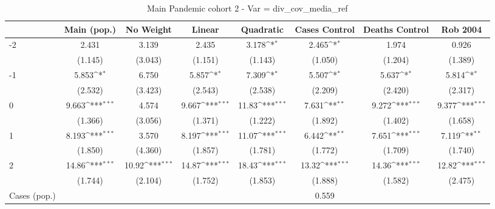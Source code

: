 \documentclass{article}
\begin{document}
{
\def\sym#1{\ifmmode^{#1}\else\(^{#1}\)\fi}
\begin{longtable}{l*{7}{c}}
\caption{Main Pandemic cohort 2 - Var = div\_cov\_media\_ref}\\
\hline\hline\endfirsthead\hline\endhead\hline\endfoot\endlastfoot
                &\multicolumn{1}{c}{Main (pop.)}&\multicolumn{1}{c}{No Weight}&\multicolumn{1}{c}{Linear}&\multicolumn{1}{c}{Quadratic}&\multicolumn{1}{c}{Cases Control}&\multicolumn{1}{c}{Deaths Control}&\multicolumn{1}{c}{Rob 2004}\\
\hline
-2              &    2.431         &    3.139         &    2.435         &    3.178\sym{*}  &    2.465\sym{*}  &    1.974         &    0.926         \\
                &  (1.145)         &  (3.043)         &  (1.151)         &  (1.143)         &  (1.050)         &  (1.204)         &  (1.389)         \\
-1              &    5.853\sym{*}  &    6.750         &    5.857\sym{*}  &    7.309\sym{*}  &    5.507\sym{*}  &    5.637\sym{*}  &    5.814\sym{*}  \\
                &  (2.532)         &  (3.423)         &  (2.543)         &  (2.538)         &  (2.209)         &  (2.420)         &  (2.317)         \\
0               &    9.663\sym{***}&    4.574         &    9.667\sym{***}&    11.83\sym{***}&    7.631\sym{**} &    9.272\sym{***}&    9.377\sym{***}\\
                &  (1.366)         &  (3.056)         &  (1.371)         &  (1.222)         &  (1.892)         &  (1.402)         &  (1.658)         \\
1               &    8.193\sym{***}&    3.570         &    8.197\sym{***}&    11.07\sym{***}&    6.442\sym{**} &    7.651\sym{***}&    7.119\sym{**} \\
                &  (1.850)         &  (4.360)         &  (1.857)         &  (1.781)         &  (1.772)         &  (1.709)         &  (1.740)         \\
2               &    14.86\sym{***}&    10.92\sym{***}&    14.87\sym{***}&    18.43\sym{***}&    13.32\sym{***}&    14.36\sym{***}&    12.82\sym{***}\\
                &  (1.744)         &  (2.104)         &  (1.752)         &  (1.853)         &  (1.888)         &  (1.582)         &  (2.475)         \\
Cases (pop.)    &                  &                  &                  &                  &    0.559         &                  &                  \\

\end{longtable}}
\end{document}

